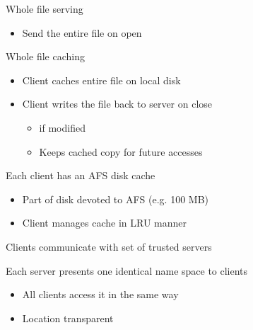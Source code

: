 \begin{slide}

	
	Whole file serving
	\begin{itemize}
		\item Send the entire file on open 
	\end{itemize}
	\medskip
	
	Whole file caching
	\begin{itemize}
		\item Client caches entire file on local disk 
		\item Client writes the file back to server on close 
		\begin{itemize} 
			\item if modified 
			\item Keeps cached copy for future accesses
		\end{itemize}
	
	\end{itemize}
	
\end{slide}

\begin{slide}

	
	Each client has an AFS disk cache
	\begin{itemize}
		\item Part of disk devoted to AFS (e.g. 100 MB)
		\item Client manages cache in LRU manner
	\end{itemize}
	\medskip
	
	Clients communicate with set of trusted servers 
	\medskip
	
	Each server presents one identical name space to clients
	\begin{itemize}
		\item All clients access it in the same way 
		\item Location transparent
	\end{itemize}
	
\end{slide}

